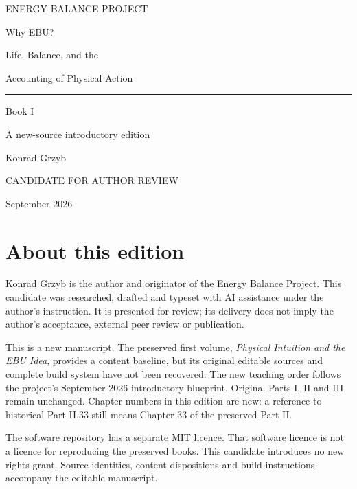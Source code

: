 \documentclass[11pt,twoside,openany]{book}
\begin{document}
\frontmatter
\begin{titlepage}
\color{ink}
\noindent\small\sffamily ENERGY BALANCE PROJECT\par
\vspace{49pt}
\noindent\fontsize{42}{45}\selectfont Why EBU?\par
\vspace{20pt}
\noindent\fontsize{23}{29}\selectfont Life, Balance, and the\par\noindent Accounting of Physical Action\par
\vspace{32pt}\hrule\vspace{21pt}
\noindent\large Book I\par
\vspace{8pt}\noindent\normalsize A new-source introductory edition\par
\vfill
\noindent\large Konrad Grzyb\par
\vspace{20pt}
\noindent\small\sffamily CANDIDATE FOR AUTHOR REVIEW\par
\vspace{5pt} September 2026\par
\end{titlepage}
\chapter*{About this edition}
Konrad Grzyb is the author and originator of the Energy Balance Project. This candidate was researched, drafted and typeset with AI assistance under the author's instruction. It is presented for review; its delivery does not imply the author's acceptance, external peer review or publication.

This is a new manuscript. The preserved first volume, \textit{Physical Intuition and the EBU Idea}, provides a content baseline, but its original editable sources and complete build system have not been recovered. The new teaching order follows the project's September 2026 introductory blueprint. Original Parts I, II and III remain unchanged. Chapter numbers in this edition are new: a reference to historical Part II.33 still means Chapter 33 of the preserved Part II.

The software repository has a separate MIT licence. That software licence is not a licence for reproducing the preserved books. This candidate introduces no new rights grant. Source identities, content dispositions and build instructions accompany the editable manuscript.
\end{document}
